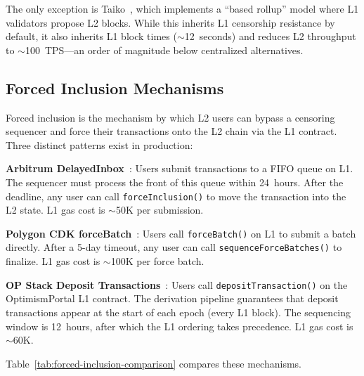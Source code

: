 The only exception is Taiko~\cite{taiko2024based}, which implements a ``based rollup''
model where L1 validators propose L2 blocks. While this inherits L1 censorship resistance
by default, it also inherits L1 block times (${\sim}$12~seconds) and reduces L2 throughput
to ${\sim}$100~TPS---an order of magnitude below centralized alternatives.

\subsection{Forced Inclusion Mechanisms}

Forced inclusion is the mechanism by which L2 users can bypass a censoring sequencer
and force their transactions onto the L2 chain via the L1 contract. Three distinct
patterns exist in production:

\textbf{Arbitrum DelayedInbox}~\cite{arbitrum2024architecture}: Users submit transactions
to a FIFO queue on L1. The sequencer must process the front of this queue within
24~hours. After the deadline, any user can call \texttt{forceInclusion()} to move the
transaction into the L2 state. L1 gas cost is ${\sim}$50K per submission.

\textbf{Polygon CDK forceBatch}~\cite{polygon2024cdk}: Users call \texttt{forceBatch()}
on L1 to submit a batch directly. After a 5-day timeout, any user can call
\texttt{sequenceForceBatches()} to finalize. L1 gas cost is ${\sim}$100K per force batch.

\textbf{OP Stack Deposit Transactions}~\cite{optimism2024derivation}: Users call
\texttt{depositTransaction()} on the OptimismPortal L1 contract. The derivation pipeline
guarantees that deposit transactions appear at the start of each epoch (every L1 block).
The sequencing window is 12~hours, after which the L1 ordering takes precedence.
L1 gas cost is ${\sim}$60K.

Table~\ref{tab:forced-inclusion-comparison} compares these mechanisms.


